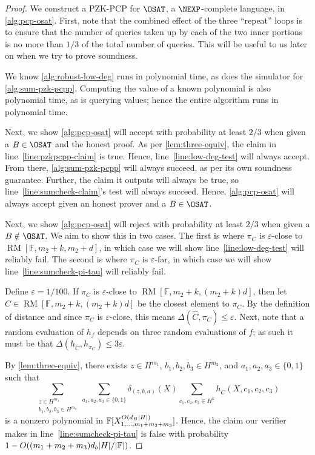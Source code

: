 \documentclass[english,12pt]{reedthesis}
\theoremstyle{plain}
\theoremstyle{definition}
\theoremstyle{remark}
\DeclareMathOperator{\RM}{RM}
\DeclarePairedDelimiter{\abs}{\lvert}{\rvert}
\begin{document}
\begin{proof}
  We construct a PZK-PCP for $\OSAT$, a $\NEXP$-complete language, in
  \cref{alg:pcp-osat}. First, note that the combined effect of the three
  ``repeat'' loops is to ensure that the number of queries taken up by each of
  the two inner portions is no more than $1/3$ of the total number of queries.
  This will be useful to us later on when we try to prove soundness.

  We know \cref{alg:robust-low-deg} runs in polynomial time, as does the
  simulator for \cref{alg:sum-pzk-pcpp}. Computing the value of a known
  polynomial is also polynomial time, as is querying values; hence the entire
  algorithm runs in polynomial time.

  Next, we show \cref{alg:pcp-osat} will accept with probability at least $2/3$
  when given a $B \in \OSAT$ and the honest proof. As per \cref{lem:three-equiv},
  the claim in line~\ref{line:pzkpcpp-claim} is true. Hence,
  line~\ref{line:low-deg-test} will always accept. From there,
  \cref{alg:sum-pzk-pcpp} will always succeed, as per its own soundness
  guarantee. Further, the claim it outputs will always be true, so
  line~\ref{line:sumcheck-claim}'s test will always succeed. Hence,
  \cref{alg:pcp-osat} will always accept given an honest prover and a
  $B \in \OSAT$.

  Next, we show \cref{alg:pcp-osat} will reject with probability at least $2/3$
  when given a $B \notin \OSAT$. We aim to show this in two cases. The first is where
  $\pi_{C}$ is $\varepsilon$-close to $\RM[\mathbb{F}, m_{2}+k, m_{2}+d]$, in which case we
  will show line~\ref{line:low-deg-test} will reliably fail. The second is where
  $\pi_{C}$ is $\varepsilon$-far, in which case we will show line~\ref{line:sumcheck-pi-tau}
  will reliably fail.

  Define $\varepsilon = 1/100$. If $\pi_{C}$ is $\varepsilon$-close to
  $\RM[\mathbb{F}, m_{2}+k, (m_{2}+k)d]$, then let
  $\hat{C} \in \RM[\mathbb{F}, m_{2}+k, (m_{2}+k)d]$ be the closest element to
  $\pi_{C}$. By the definition of distance and since $\pi_{C}$ is $\varepsilon$-close, this
  means $\Delta(\hat{C}, \pi_{C}) \le \varepsilon$. Next, note that a random evaluation of $h_{f}$
  depends on three random evaluations of $f$; as such it must be that
  $\Delta(h_{\hat{C}}, h_{\pi_{C}}) \le 3\varepsilon$.

  By \cref{lem:three-equiv}, there exists $z \in H^{m_{1}}$,
  $b_{1}, b_{2}, b_{3} \in H^{m_{2}}$, and $a_{1}, a_{2}, a_{3} \in \{0, 1\}$ such
  that
  \begin{equation}
    \sum_{\substack{z \in H^{m_{1}} \\ b_{1}, b_{2}, b_{3} \in H^{m_{2}}}}\sum_{a_{1}, a_{2}, a_{3} \in \{0, 1\}}
    \delta_{(z,b,a)}(X)\sum_{c_{1}, c_{2}, c_{3} \in H^{k}}h_{\hat{C}}(X, c_{1}, c_{2}, c_{3})
  \end{equation}
  is a nonzero polynomial in
  $\mathbb{F}[X_{1, \ldots, m_{1}+m_{2}+m_{3}}^{O(d_{B}\abs{H})}]$. Hence, the claim
  our verifier makes in line~\ref{line:sumcheck-pi-tau} is false with
  probability $1 - O((m_{1}+m_{2}+m_{3})d_{b}\abs{H}/\abs{\mathbb{F}})$.


\end{proof}
\end{document}
